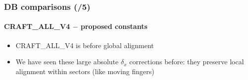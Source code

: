 \documentclass[compress]{beamer}
\begin{document}
\begin{frame}
\frametitle{DB comparisons (/5)}
\framesubtitle{CRAFT\_ALL\_V4 $-$ proposed constants}

\begin{itemize}
\item CRAFT\_ALL\_V4 is before global alignment
\item We have seen these large absolute $\delta_x$ corrections before:
  they preserve local alignment within sectors (like moving fingers)
\end{itemize}



\end{frame}
\end{document}

